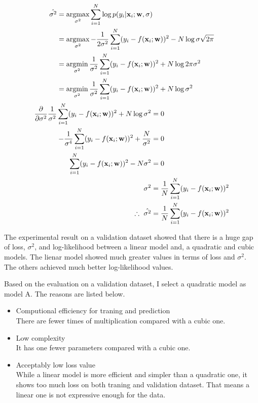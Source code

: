 \documentclass{introtosml}
\begin{document}
\begin{p}
  \item
    \begin{gather*}
      \begin{aligned}
        \hat{\sigma^2}
        & = \argmax_{\sigma^2} \sum_{i=1}^N \log p(y_i|\vec{x}_i; \vec{w}, \sigma) \\
        & = \argmax_{\sigma^2} - \frac{1}{2 \sigma^2}
            \sum_{i=1}^N (y_i - f(\vec{x}_i; \vec{w}))^2 - N \log \sigma \sqrt{2 \pi} \\
        & = \argmin_{\sigma^2} \frac{1}{\sigma^2}
            \sum_{i=1}^N (y_i - f(\vec{x}_i; \vec{w}))^2 + N \log 2 \pi \sigma^2 \\
        & = \argmin_{\sigma^2} \frac{1}{\sigma^2}
            \sum_{i=1}^N (y_i - f(\vec{x}_i; \vec{w}))^2 + N \log \sigma^2
      \end{aligned} \\
      \begin{aligned}
      \frac{\partial}{\partial \sigma^2} \frac{1}{\sigma^2}
          \sum_{i=1}^N (y_i - f(\vec{x}_i; \vec{w}))^2 + N \log \sigma^2 & = 0 \\
      - \frac{1}{\sigma^4}
          \sum_{i=1}^N (y_i - f(\vec{x}_i; \vec{w}))^2 + \frac{N}{\sigma^2} & = 0 \\
      \sum_{i=1}^N (y_i - f(\vec{x}_i; \vec{w}))^2 - N \sigma^2 & = 0 \\
      \sigma^2 & = \frac{1}{N} \sum_{i=1}^N (y_i - f(\vec{x}_i; \vec{w}))^2 \\
      \therefore \hat{\sigma^2} & = \frac{1}{N} \sum_{i=1}^N (y_i - f(\vec{x}_i; \vec{w}))^2
      \end{aligned}
    \end{gather*}

    The experimental result on a validation dataset showed that there is a huge
    gap of loss, $\sigma^2$, and log-likelihood between a linear model and, a quadratic
    and cubic models.
    The lienar model showed much greater values in terms of loss and $\sigma^2$.
    The others achieved much better log-likelihood values.

    Based on the evaluation on a validation dataset, I select a quadratic model
    as model A.
    The reasons are listed below.
    \begin{itemize}
      \item Computional efficiency for traning and prediction \\
            There are fewer times of multiplication compared with a cubic one.
      \item Low complexity \\
            It has one fewer parameters compared with a cubic one.
      \item Acceptably low loss value \\
            While a linear model is more efficient and simpler than a quadratic one,
            it shows too much loss on both traning and validation dataset.
            That means a linear one is not expressive enough for the data.


\end{itemize}
\end{p}
\end{document}
